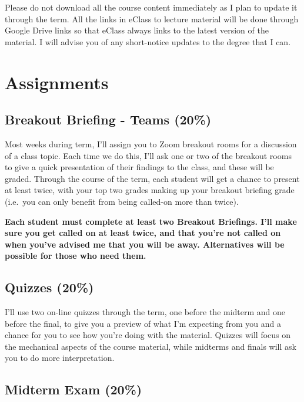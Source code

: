 \documentclass[11pt,]{article}
\begin{document}
Please do not download all the course content immediately as I plan to
update it through the term. All the links in eClass to lecture material
will be done through Google Drive links so that eClass always links to
the latest version of the material. I will advise you of any
short-notice updates to the degree that I can.

\hypertarget{assignments}{%
\section{Assignments}\label{assignments}}

\hypertarget{breakout-briefing---teams-20}{%
\subsection{Breakout Briefing - Teams
(20\%)}\label{breakout-briefing---teams-20}}

Most weeks during term, I'll assign you to Zoom breakout rooms for a
discussion of a class topic. Each time we do this, I'll ask one or two
of the breakout rooms to give a quick presentation of their findings to
the class, and these will be graded. Through the course of the term,
each student will get a chance to present at least twice, with your top
two grades making up your breakout briefing grade (i.e.~you can only
benefit from being called-on more than twice).

\textbf{Each student must complete at least two Breakout Briefings.  I'll make sure you get called on at least twice, and that you're not called on when you've advised me that you will be away. Alternatives will be possible for those who need them.}

\hypertarget{quizzes-20}{%
\subsection{Quizzes (20\%)}\label{quizzes-20}}

I'll use two on-line quizzes through the term, one before the midterm
and one before the final, to give you a preview of what I'm expecting
from you and a chance for you to see how you're doing with the material.
Quizzes will focus on the mechanical aspects of the course material,
while midterms and finals will ask you to do more interpretation.

\hypertarget{midterm-exam-20}{%
\subsection{Midterm Exam (20\%)}\label{midterm-exam-20}}
\end{document}
